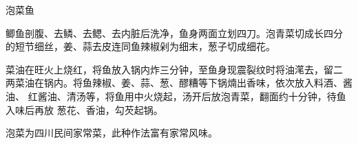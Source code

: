 %
%
%
%
%
%
%
\begin{recipe}{泡菜鱼}

\ingredients


\preparation

\step 鲫鱼剖腹、去鳞、去鳃、去内脏后洗净，鱼身两面立划四刀。泡青菜切成长四分
的短节细丝，姜、蒜去皮连同鱼辣椒剁为细末，葱子切成细花。

\step 菜油在旺火上烧红，将鱼放入锅内炸三分钟，至鱼身现震裂纹时将油滗去，留二
两菜油在锅内。将鱼辣椒、姜、蒜、葱、醪糟等下锅煵出香味，依次放入料酒、酱油、
红酱油、清汤等，将鱼用中火烧起，汤开后放泡青菜，翻面约十分钟，待鱼入味后再放
葱花、香油，勾芡起锅。

\features

泡菜为四川民间家常菜，此种作法富有家常风味。

\end{recipe}


